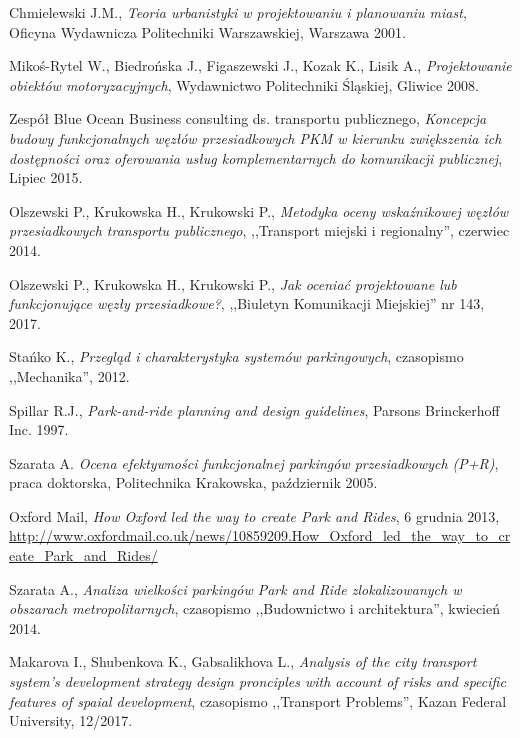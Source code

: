 \begin{thebibliography}{99}

	Chmielewski J.M.,	\emph{Teoria urbanistyki w projektowaniu i planowaniu miast},	Oficyna Wydawnicza Politechniki Warszawskiej, Warszawa 2001.

	Mikoś-Rytel W., Biedrońska J., Figaszewski J., Kozak K., Lisik A.,	\emph{Projektowanie obiektów motoryzacyjnych},	Wydawnictwo Politechniki Śląskiej, Gliwice 2008.

	Zespół Blue Ocean Business consulting ds. transportu publicznego,
	\emph{Koncepcja budowy funkcjonalnych węzłów przesiadkowych PKM w kierunku zwiększenia ich dostępności oraz oferowania usług komplementarnych do komunikacji publicznej},
	Lipiec 2015.
	
	Olszewski P., Krukowska H., Krukowski P.,	\emph{Metodyka oceny wskaźnikowej węzłów przesiadkowych transportu publicznego},
	 ,,Transport miejski i regionalny'', 	czerwiec 2014.
	
	Olszewski P., Krukowska H., Krukowski P., \emph{Jak oceniać projektowane lub funkcjonujące węzły przesiadkowe?}, ,,Biuletyn Komunikacji Miejskiej'' nr 143, 2017.
	
	Stańko K.,	\emph{Przegląd i charakterystyka systemów parkingowych}, czasopismo ,,Mechanika'', 2012.
	
	Spillar R.J.,	\emph{Park-and-ride planning and design guidelines},	Parsons Brinckerhoff Inc. 1997.
	
	Szarata A.	\emph{Ocena efektywności funkcjonalnej parkingów przesiadkowych (P+R)},	praca doktorska, Politechnika Krakowska, październik 2005.

		Oxford Mail, \emph{How Oxford led the way to create Park and Rides},	6 grudnia 2013,
	\url{http://www.oxfordmail.co.uk/news/10859209.How_Oxford_led_the_way_to_create_Park_and_Rides/}
	
	Szarata A.,
	\emph{Analiza wielkości parkingów Park and Ride zlokalizowanych w obszarach metropolitarnych}, czasopismo ,,Budownictwo i architektura'', kwiecień 2014.
	
	Makarova I., Shubenkova K., Gabsalikhova L.,	\emph{Analysis of the city transport system's development strategy design pronciples with account of risks and specific features of spaial development},	czasopismo ,,Transport Problems'', Kazan Federal University, 12/2017.
	

\end{thebibliography}
